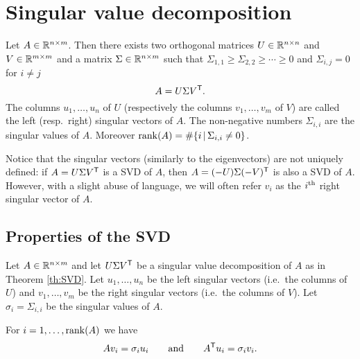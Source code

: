 \documentclass[11pt,nocut]{article}
\begin{document}
\section{Singular value decomposition}

\begin{theorem}\label{th:SVD}
	Let $A \in \mathbb{R}^{n \times m}$. Then there exists two orthogonal matrices $U \in \mathbb{R}^{n \times n}$ and $V \in \mathbb{R}^{m \times m}$ and a matrix $\Sigma \in \mathbb{R}^{n \times m}$ such that $\Sigma_{1,1} \geq \Sigma_{2,2}  \geq \cdots \geq 0$ and $\Sigma_{i,j} = 0$ for $i\neq j$
	$$
	A = U \Sigma V^{{\sf T}}.
	$$
	The columns $u_1, \dots, u_n$ of $U$ (respectively the columns $v_1, \dots, v_m$ of $V$) are called the left (resp.\ right) singular vectors of $A$. The non-negative numbers $\Sigma_{i,i}$ are the singular values of $A$. Moreover ${{\rm rank}}(A) = \# \{i \, | \, \Sigma_{i,i} \neq 0 \}$.
\end{theorem}

Notice that the singular vectors (similarly to the eigenvectors) are not uniquely defined: if $A = U \Sigma V^{{\sf T}}$ is a SVD of $A$, then $A = (-U) \Sigma (-V)^{{\sf T}}$ is also a SVD of $A$. However, with a slight abuse of language, we will often refer $v_i$ as the $i^{\rm th}$ right singular vector of $A$.

\subsection{Properties of the SVD}

Let $A \in \mathbb{R}^{n \times m}$ and let $U \Sigma V^{{\sf T}}$ be a singular value decomposition of $A$ as in Theorem \ref{th:SVD}. Let $u_1, \dots, u_n$ be the left singular vectors (i.e.\ the columns of $U$) and $v_1, \dots, v_m$ be the right singular vectors (i.e.\ the columns of $V$). Let $\sigma_i = \Sigma_{i,i}$ be the singular values of $A$.

\begin{proposition}
	For $i=1, \dots, {{\rm rank}}(A)$ we have
	$$
	A v_i = \sigma_i u_i
	\qquad \text{and} \qquad
	A^{{\sf T}} u_i = \sigma_i v_i.
	$$
\end{proposition}
\end{document}
